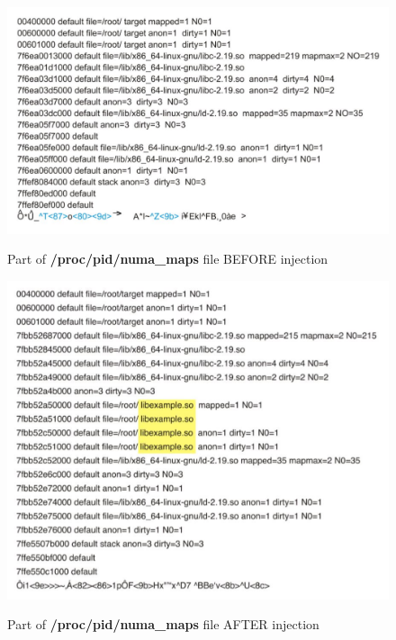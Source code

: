 \documentclass[conference]{IEEEtran}
\newcommand{\marcos}[1]{{\color{green}{MARCOS: #1}}}
\begin{document}
\begin{figure}[htb!]
\footnotesize
\caption{Part of \textbf{/proc/pid/numa\_maps} file BEFORE injection }
\includegraphics[scale=0.35]{antes-injecao.pdf}
\centering
\label{fig:antes-injecao}
\end{figure}


\begin{figure}[htb!]
\footnotesize
\caption{Part of \textbf{/proc/pid/numa\_maps} file AFTER injection }
\includegraphics[center,scale=0.32]{apos-injecao.pdf}
\centering
\label{fig:apos-injecao}
\end{figure}

\end{document}
